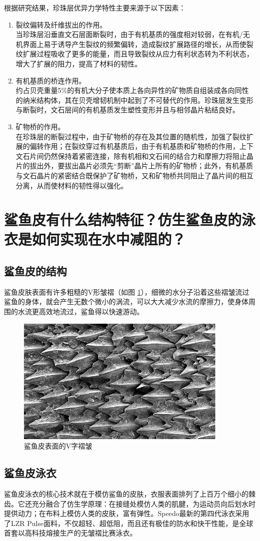\documentclass[UTF8,9pt]{ctexart}
\newcommand\se{\section}                                               %
\newcommand\sub{\subsection}                                           %
\newcommand{\rk}[1]{\begin{enumerate}                              %
        #1
    \end{enumerate}}
\begin{document}
根据研究结果，珍珠层优异力学特性主要来源于以下因素：
\rk{
    \item 裂纹偏转及纤维拔出的作用。\\
    当珍珠层沿垂直文石层面断裂时，由于有机基质的强度相对较弱，在有机/无机界面上易于诱导产生裂纹的频繁偏转，造成裂纹扩展路径的增长，从而使裂纹扩展过程吸收了更多的能量，而且导致裂纹从应力有利状态转为不利状态，增大了扩展的阻力，提高了材料的韧性。
    \item 有机基质的桥连作用。\\
    约占贝壳重量5\%的有机大分子使本质上各向异性的矿物质自组装成各向同性的纳米结构体，其在贝壳增韧机制中起到了不可替代的作用。珍珠层发生变形与断裂时，文石层间的有机基质发生塑性变形并且与相邻晶片粘结良好。
    \item 矿物桥的作用。\\
    在珍珠层的断裂过程中，由于矿物桥的存在及其位置的随机性，加强了裂纹扩展的偏转作用；在裂纹穿过有机基质后，由于有机基质和矿物桥的作用，上下文石片间仍然保持着紧密连接，除有机相和文石间的结合力和摩擦力将阻止晶片的拔出外，要拔出晶片必须先“剪断”晶片上所有的矿物桥；此外，有机基质与文石晶片的紧密结合既保护了矿物桥，又和矿物桥共同阻止了晶片间的相互分离，从而使材料的韧性得以强化。
}

\se{鲨鱼皮有什么结构特征？仿生鲨鱼皮的泳衣是如何实现在水中减阻的？}
\sub{鲨鱼皮的结构}
鲨鱼皮肤表面有许多粗糙的V形皱褶（如图 \ref{sy}），细微的水分子沿着这些褶皱流过鲨鱼的身体，就会产生无数个微小的涡流，可以大大减少水流的摩擦力，使身体周围的水流更高效地流过，鲨鱼得以快速游动。
\begin{figure}[htbp]
    \centering
    \includegraphics[scale=0.4]{7.jpg}
    \caption{鲨鱼皮表面的V字褶皱}
    \label{sy}
\end{figure}
\sub{鲨鱼皮泳衣}
鲨鱼皮泳衣的核心技术就在于模仿鲨鱼的皮肤，衣服表面排列了上百万个细小的棘齿。它还充分融合了仿生学原理：在接缝处模仿人类的肌腱，为运动员向后划水时提供动力；在布料上模仿人类的皮肤，富有弹性。Speedo最新的第四代泳衣采用了LZR Pulse面料，不仅超轻、超低阻，而且还有极佳的防水和快干性能，是全球首套以高科技熔接生产的无皱褶比赛泳衣。
\end{document}
